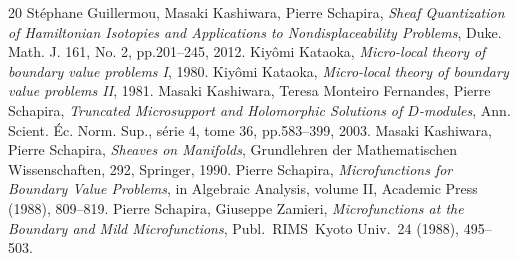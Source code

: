 \begin{thebibliography}{20} 
   St\'ephane Guillermou, 
  Masaki Kashiwara, Pierre Schapira, 
  \textit{Sheaf Quantization of Hamiltonian Isotopies and Applications to Nondisplaceability Problems}, 
  Duke. Math. J. 161, No. 2, pp.201--245, 2012.  
   Kiy\^omi Kataoka, 
  \textit{Micro-local theory of boundary value problems I}, 1980.
   Kiy\^omi Kataoka, 
  \textit{Micro-local theory of boundary value problems II}, 1981.
   Masaki Kashiwara, Teresa Monteiro Fernandes, Pierre Schapira, 
    \textit{Truncated Microsupport and Holomorphic Solutions 
    of \(D\)-modules}, 
    Ann. Scient. \'Ec. Norm. Sup., s\'erie 4, tome 36, 
    pp.583--399, 2003.
   Masaki Kashiwara, Pierre Schapira, 
    \textit{Sheaves on Manifolds}, 
    Grundlehren der Mathematischen Wissenschaften, 292, Springer, 1990.
   Pierre Schapira, 
    \textit{Microfunctions for Boundary Value Problems}, 
    in Algebraic Analysis, volume II, Academic Press (1988), 809--819. 
   Pierre Schapira, Giuseppe Zamieri, 
    \textit{Microfunctions at the Boundary and Mild Microfunctions}, 
    Publ.~RIMS~Kyoto Univ.~24 (1988), 495--503. 
\end{thebibliography}



